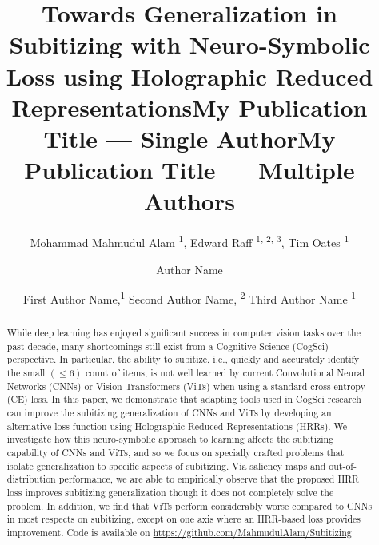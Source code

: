 \documentclass[letterpaper]{article} %
\title{Towards Generalization in Subitizing with Neuro-Symbolic Loss using Holographic Reduced Representations}
\author{Mohammad Mahmudul Alam \textsuperscript{\rm 1},
Edward Raff \textsuperscript{\rm 1, 2, 3},
Tim Oates \textsuperscript{\rm 1}
}
\title{My Publication Title --- Single Author}
\author {
    Author Name
}
\title{My Publication Title --- Multiple Authors}
\author {
    First Author Name,\textsuperscript{\rm 1}
    Second Author Name, \textsuperscript{\rm 2}
    Third Author Name \textsuperscript{\rm 1}
}
\begin{document}
\maketitle

\begin{abstract}
While deep learning has enjoyed significant success in computer vision tasks over the past decade, many shortcomings still exist from a Cognitive Science (CogSci) perspective. In particular, the ability to subitize, i.e., quickly and accurately identify the small $(\leq 6)$ count of items, is not well learned by current Convolutional Neural Networks (CNNs) or Vision Transformers (ViTs) when using a standard cross-entropy (CE) loss. In this paper, we demonstrate that adapting tools used in CogSci research can improve the subitizing generalization of CNNs and ViTs by developing an alternative loss function using Holographic Reduced Representations (HRRs).  We investigate how this neuro-symbolic approach to learning affects the subitizing capability of CNNs and ViTs, and so we focus on specially crafted problems that isolate generalization to specific aspects of subitizing. Via saliency maps and out-of-distribution performance, we are able to empirically observe that the proposed HRR loss improves subitizing generalization though it does not completely solve the problem. In addition, we find that ViTs perform considerably worse compared to CNNs in most respects on subitizing, except on one axis where an HRR-based loss provides improvement. Code is available on \color{magenta}\url{https://github.com/MahmudulAlam/Subitizing}
\end{abstract}

\vspace{-2mm}
\end{document}

